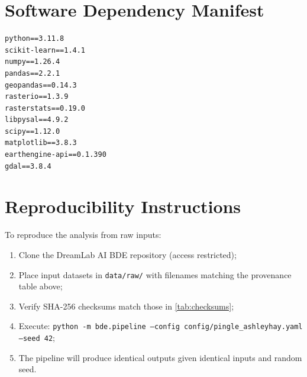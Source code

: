 \section{Software Dependency Manifest}

\begin{lstlisting}[caption={Python environment specification (requirements.txt extract).},label={lst:requirements}]
python==3.11.8
scikit-learn==1.4.1
numpy==1.26.4
pandas==2.2.1
geopandas==0.14.3
rasterio==1.3.9
rasterstats==0.19.0
libpysal==4.9.2
scipy==1.12.0
matplotlib==3.8.3
earthengine-api==0.1.390
gdal==3.8.4
\end{lstlisting}

\section{Reproducibility Instructions}

To reproduce the analysis from raw inputs:

\begin{enumerate}
  \item Clone the DreamLab AI BDE repository (access restricted);
  \item Place input datasets in \texttt{data/raw/} with filenames matching the provenance table above;
  \item Verify SHA-256 checksums match those in \cref{tab:checksums};
  \item Execute: \texttt{python -m bde.pipeline --config config/pingle\_ashleyhay.yaml --seed 42};
  \item The pipeline will produce identical outputs given identical inputs and random seed.
\end{enumerate}
